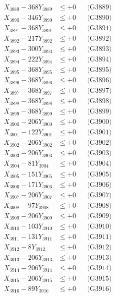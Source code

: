 \documentclass[a4paper,10pt]{article}
\begin{document}
{\begin{align}
X_{3889} - 368Y_{3889} &\leq +0 && \text{(G3889)} \\
X_{3890} - 346Y_{3890} &\leq +0 && \text{(G3890)} \\
\allowbreak
X_{3891} - 368Y_{3891} &\leq +0 && \text{(G3891)} \\
X_{3892} - 217Y_{3892} &\leq +0 && \text{(G3892)} \\
X_{3893} - 300Y_{3893} &\leq +0 && \text{(G3893)} \\
X_{3894} - 222Y_{3894} &\leq +0 && \text{(G3894)} \\
X_{3895} - 368Y_{3895} &\leq +0 && \text{(G3895)} \\
X_{3896} - 368Y_{3896} &\leq +0 && \text{(G3896)} \\
X_{3897} - 368Y_{3897} &\leq +0 && \text{(G3897)} \\
X_{3898} - 368Y_{3898} &\leq +0 && \text{(G3898)} \\
X_{3899} - 368Y_{3899} &\leq +0 && \text{(G3899)} \\
X_{3900} - 206Y_{3900} &\leq +0 && \text{(G3900)} \\
\allowbreak
X_{3901} - 122Y_{3901} &\leq +0 && \text{(G3901)} \\
X_{3902} - 206Y_{3902} &\leq +0 && \text{(G3902)} \\
X_{3903} - 206Y_{3903} &\leq +0 && \text{(G3903)} \\
X_{3904} - 81Y_{3904} &\leq +0 && \text{(G3904)} \\
X_{3905} - 151Y_{3905} &\leq +0 && \text{(G3905)} \\
X_{3906} - 171Y_{3906} &\leq +0 && \text{(G3906)} \\
X_{3907} - 206Y_{3907} &\leq +0 && \text{(G3907)} \\
X_{3908} - 97Y_{3908} &\leq +0 && \text{(G3908)} \\
X_{3909} - 206Y_{3909} &\leq +0 && \text{(G3909)} \\
X_{3910} - 103Y_{3910} &\leq +0 && \text{(G3910)} \\
\allowbreak
X_{3911} - 131Y_{3911} &\leq +0 && \text{(G3911)} \\
X_{3912} - 8Y_{3912} &\leq +0 && \text{(G3912)} \\
X_{3913} - 206Y_{3913} &\leq +0 && \text{(G3913)} \\
X_{3914} - 206Y_{3914} &\leq +0 && \text{(G3914)} \\
X_{3915} - 206Y_{3915} &\leq +0 && \text{(G3915)} \\
X_{3916} - 89Y_{3916} &\leq +0 && \text{(G3916)} \\

\end{align}}
\end{document}
